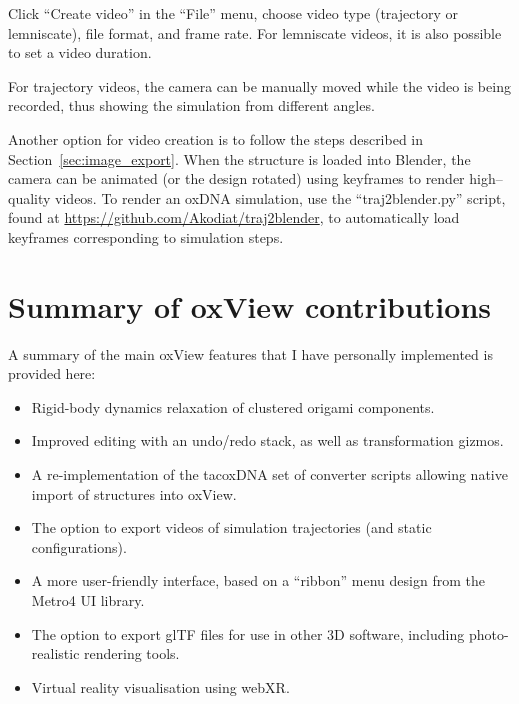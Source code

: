 Click ``Create video'' in the ``File'' menu, choose video type (trajectory or lemniscate), file format, and frame rate. For lemniscate videos, it is also possible to set a video duration.

For trajectory videos, the camera can be manually moved while the video is being recorded, thus showing the simulation from different angles.

Another option for video creation is to follow the steps described in Section~\ref{sec:image_export}. When the structure is loaded into Blender, the camera can be animated (or the design rotated) using keyframes to render high--quality videos. To render an oxDNA simulation, use the ``traj2blender.py'' script, found at \url{https://github.com/Akodiat/traj2blender}, to automatically load keyframes corresponding to simulation steps.

\section{Summary of oxView contributions}

A summary of the main oxView features that I have personally implemented is provided here:
\begin{itemize}
  \item Rigid-body dynamics relaxation of clustered origami components.
  \item Improved editing with an undo/redo stack, as well as transformation gizmos.
  \item A re-implementation of the tacoxDNA set of converter scripts allowing native import of structures into oxView.
  \item The option to export videos of simulation trajectories (and static configurations).
  \item A more user-friendly interface, based on a ``ribbon'' menu design from the Metro4 UI library.
  \item The option to export glTF files for use in other 3D software, including photo-realistic rendering tools.
  \item Virtual reality visualisation using webXR.
\end{itemize}


